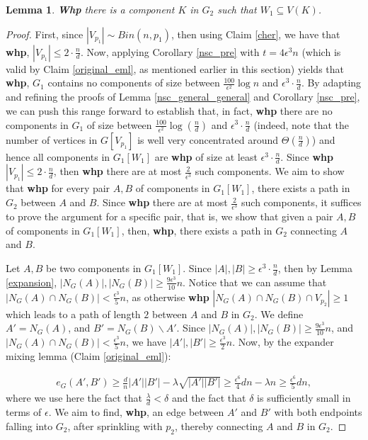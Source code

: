 \documentclass[notitlepage]{scrartcl}
\newtheorem{lemma}[thm]{Lemma}
\begin{document}
\begin{lemma} \label{one_comp_2_pseudo}
    \textbf{Whp} there is a component $K$ in $G_2$ such that $W_1\subseteq V(K)$.
\end{lemma}

\begin{proof}
    First, since $|V_{p_1}|\sim Bin(n,p_1)$, then using Claim \ref{cher}, we have that \textbf{whp}, $|V_{p_1}|\le 2\cdot \frac{n}{d}$. Now, applying Corollary \ref{nsc_pre} with $t=4\epsilon^3n$ (which is valid by Claim \ref{original_eml}, as mentioned earlier in this section) yields that \textbf{whp}, $G_1$ contains no components of size between $\frac{100}{\epsilon^2}\log n$ and $\epsilon^3\cdot \frac{n}{d}$. By adapting and refining the proofs of Lemma \ref{nsc_general_general} and Corollary \ref{nsc_pre}, we can push this range forward to establish that, in fact, \textbf{whp} there are no components in $G_1$ of size between $\frac{100}{\epsilon^2}\log \left(\frac{n}{d}\right)$ and $\epsilon^3\cdot \frac{n}{d}$ (indeed, note that the number of vertices in $G[V_{p_1}]$ is well very concentrated around $\Theta\left(\frac{n}{d}\right)$) and hence all components in $G_1[W_1]$ are \textbf{whp} of size at least $\epsilon^3\cdot \frac{n}{d}$. Since \textbf{whp} $|V_{p_1}|\le 2\cdot \frac{n}{d}$, then \textbf{whp} there are at most $\frac{2}{\epsilon^3}$ such components. We aim to show that \textbf{whp} for every pair $A,B$ of components in $G_1[W_1]$, there exists a path in $G_2$ between $A$ and $B$. Since \textbf{whp}  there are at most $\frac{2}{\epsilon^3}$ such components, it suffices to prove the argument for a specific pair, that is, we show that given a pair $A,B$ of components in $G_1[W_1]$, then, \textbf{whp}, there exists a path in $G_2$ connecting $A$ and $B$.

    Let $A,B$ be two components in $G_1[W_1]$. Since $|A|,|B|\ge \epsilon^3\cdot \frac{n}{d}$, then by Lemma \ref{expansion}, $|N_G(A)|,|N_G(B)|\ge \frac{9\epsilon^3}{10}n$. Notice that we can assume that $|N_G(A)\cap N_G(B)|< \frac{\epsilon^3}{5} n$, as otherwise \textbf{whp} $|N_G(A)\cap N_G(B)\cap V_{p_2}|\ge 1$ which leads to a path of length $2$ between $A$ and $B$ in $G_2$. We define $A'=N_G(A)$, and $B'=N_G(B)\backslash A'$. Since $|N_G(A)|,|N_G(B)|\ge \frac{9\epsilon^3}{10}n$, and $|N_G(A)\cap N_G(B)|< \frac{\epsilon^3}{5} n$, we have $|A'|,|B'|\ge \frac{\epsilon^3}{2}n$. Now, by the expander mixing lemma (Claim \ref{original_eml}):
    
    \begin{align*}
        e_G(A',B')\ge \frac{d}{n}|A'||B'|-\lambda\sqrt{|A'||B'|}\ge \frac{\epsilon^6}{4}dn-\lambda n\ge \frac{\epsilon^6}{5}dn,
    \end{align*}
    where we use here the fact that $\frac{\lambda}{d}<\delta$ and the fact that $\delta$ is sufficiently small in terms of $\epsilon$. We aim to find, \textbf{whp}, an edge between $A'$ and $B'$ with both endpoints falling into $G_2$, after sprinkling with $p_2$, thereby connecting $A$ and $B$ in $G_2$.


\end{proof}
\end{document}
